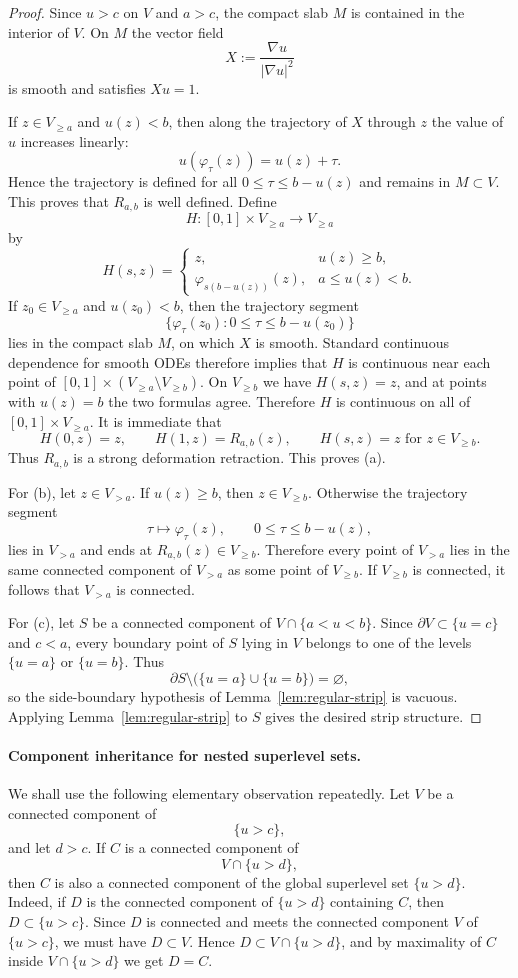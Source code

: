 \documentclass[12pt]{amsart}
\theoremstyle{definition}
\theoremstyle{remark}
\begin{document}
\begin{proof} Since $u>c$ on $V$ and $a>c$, the compact slab $M$ is contained in the interior of $V$. On $M$
the vector field
\[
 X:=\frac{\nabla u}{|\nabla u|^2}
\]
is smooth and satisfies $Xu=1$.

\indent If $z\in V_{\ge a}$ and $u(z)<b$, then along the trajectory of $X$ through $z$ the value of $u$ increases
linearly:
\[
 u(\varphi_\tau(z))=u(z)+\tau.
\]
Hence the trajectory is defined for all $0\le \tau\le b-u(z)$ and remains in $M\subset V$. This proves that
$R_{a,b}$ is well defined. Define
\[
 H:[0,1]\times V_{\ge a}\to V_{\ge a}
\]
by
\[
H(s,z)=\begin{cases}
z, & u(z)\ge b,\\
\varphi_{s(b-u(z))}(z), & a\le u(z)<b.
\end{cases}
\]
If $z_0\in V_{\ge a}$ and $u(z_0)<b$, then the trajectory segment
\[
\{\varphi_\tau(z_0):0\le \tau\le b-u(z_0)\}
\]
lies in the compact slab $M$, on which $X$ is smooth. Standard continuous dependence for smooth ODEs therefore implies that $H$ is continuous near each point of $[0,1]\times (V_{\ge a}\setminus V_{\ge b})$. On $V_{\ge b}$ we have $H(s,z)=z$, and at points with $u(z)=b$ the two formulas agree. Therefore $H$ is continuous on all of $[0,1]\times V_{\ge a}$. It is immediate that
\[
H(0,z)=z,\qquad H(1,z)=R_{a,b}(z),\qquad H(s,z)=z\text{ for }z\in V_{\ge b}.
\]
Thus $R_{a,b}$ is a strong deformation retraction. This proves (a).

\indent For (b), let $z\in V_{>a}$. If $u(z)\ge b$, then $z\in V_{\ge b}$. Otherwise the trajectory segment
\[
\tau\mapsto \varphi_\tau(z),\qquad 0\le \tau\le b-u(z),
\]
lies in $V_{>a}$ and ends at $R_{a,b}(z)\in V_{\ge b}$. Therefore every point of $V_{>a}$ lies in the same connected
component of $V_{>a}$ as some point of $V_{\ge b}$. If $V_{\ge b}$ is connected, it follows that $V_{>a}$ is connected.

\indent For (c), let $S$ be a connected component of $V\cap\{a<u<b\}$. Since $\partial V\subset\{u=c\}$ and $c<a$,
every boundary point of $S$ lying in $V$ belongs to one of the levels $\{u=a\}$ or $\{u=b\}$. Thus
\[
\partial S\setminus \bigl(\{u=a\}\cup\{u=b\}\bigr)=\varnothing,
\]
so the side-boundary hypothesis of Lemma~\ref{lem:regular-strip} is vacuous. Applying Lemma~\ref{lem:regular-strip} to $S$ gives the desired
strip structure. \end{proof}


\paragraph{Component inheritance for nested superlevel sets.}
We shall use the following elementary observation repeatedly. Let \(V\) be a connected component of
\[
\{u>c\},
\]
and let \(d>c\). If \(C\) is a connected component of
\[
V\cap\{u>d\},
\]
then \(C\) is also a connected component of the global superlevel set \(\{u>d\}\). Indeed, if \(D\) is the
connected component of \(\{u>d\}\) containing \(C\), then \(D\subset \{u>c\}\). Since \(D\) is connected
and meets the connected component \(V\) of \(\{u>c\}\), we must have \(D\subset V\). Hence
\(D\subset V\cap\{u>d\}\), and by maximality of \(C\) inside \(V\cap\{u>d\}\) we get \(D=C\).
\end{document}
